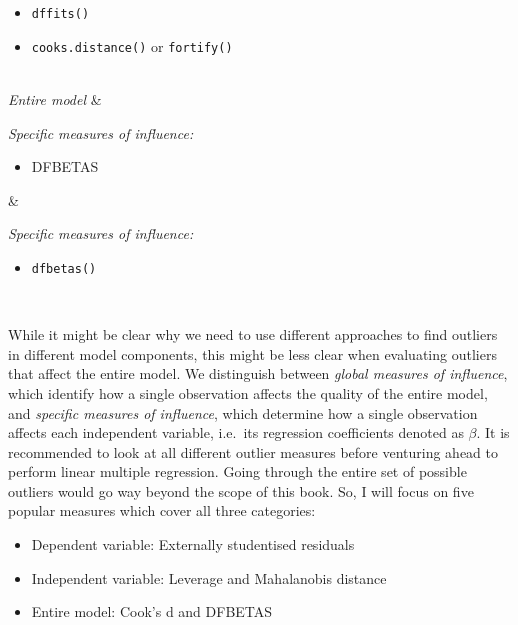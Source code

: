 \documentclass[
  letterpaper,
]{krantz}
\providecommand{\tightlist}{%
  \setlength{\itemsep}{0pt}\setlength{\parskip}{0pt}}\usepackage{longtable,booktabs,array}
\begin{document}
\begin{longtable}[]
\begin{minipage}[t]{\linewidth}
\begin{itemize}
\item
  \texttt{dffits()}
\item
  \texttt{cooks.distance()} or \texttt{fortify()}
\end{itemize}
\end{minipage} \\
\emph{Entire model} & \begin{minipage}[t]{\linewidth}\raggedright
\emph{Specific measures of influence:}

\begin{itemize}
\tightlist
\item
  DFBETAS
\end{itemize}
\end{minipage} & \begin{minipage}[t]{\linewidth}\raggedright
\emph{Specific measures of influence:}

\begin{itemize}
\tightlist
\item
  \texttt{dfbetas()}
\end{itemize}
\end{minipage} \\
\end{longtable}

While it might be clear why we need to use different approaches to find
outliers in different model components, this might be less clear when
evaluating outliers that affect the entire model. We distinguish between
\emph{global measures of influence}, which identify how a single
observation affects the quality of the entire model, and \emph{specific
measures of influence}, which determine how a single observation affects
each independent variable, i.e.~its regression coefficients denoted as
\(\beta\). It is recommended to look at all different outlier measures
before venturing ahead to perform linear multiple regression. Going
through the entire set of possible outliers would go way beyond the
scope of this book. So, I will focus on five popular measures which
cover all three categories:

\begin{itemize}
\item
  Dependent variable: Externally studentised residuals
\item
  Independent variable: Leverage and Mahalanobis distance
\item
  Entire model: Cook's d and DFBETAS
\end{itemize}
\end{document}
